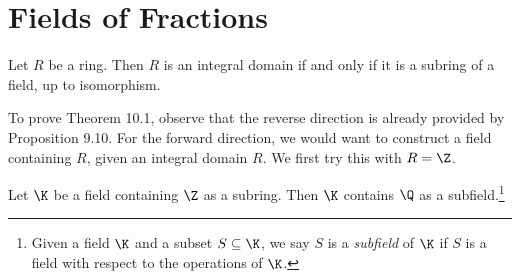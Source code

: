 \documentclass[pmath347]{subfiles}
\begin{document}

    \section{Fields of Fractions}

    \begin{theorem}{}
        Let $R$ be a ring. Then $R$ is an integral domain if and only if it is a subring of a field, up to isomorphism.
    \end{theorem}
    
    \np To prove Theorem 10.1, observe that the reverse direction is already provided by Proposition 9.10. For the forward direction, we would want to construct a field containing $R$, given an integral domain $R$. We first try this with $R=\Z$.

    \begin{prop}{}
        Let $\K$ be a field containing $\Z$ as a subring. Then $\K$ contains $\Q$ as a subfield.\footnote{Given a field $\K$ and a subset $S\subseteq\K$, we say $S$ is a \emph{subfield} of $\K$ if $S$ is a field with respect to the operations of $\K$.}
    \end{prop}
\end{document}
